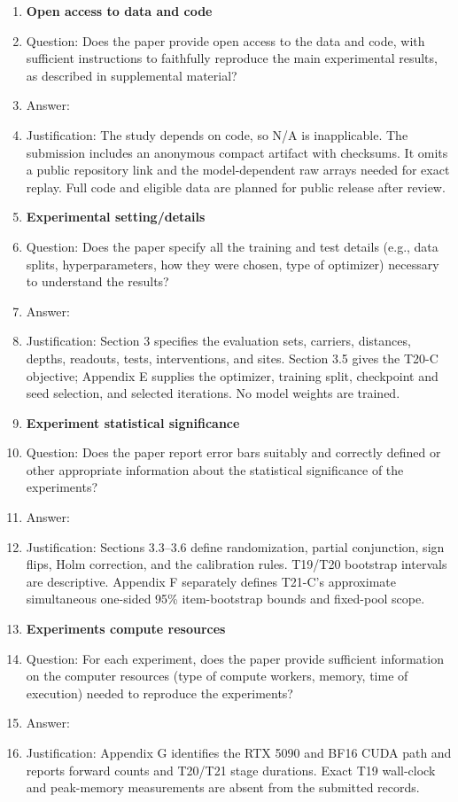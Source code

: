 \begin{enumerate}
\item {\bf Open access to data and code}
  \item[] Question: Does the paper provide open access to the data and code, with sufficient instructions to faithfully reproduce the main experimental results, as described in supplemental material?
  \item[] Answer: \answerNo{}
  \item[] Justification: The study depends on code, so N/A is inapplicable. The submission includes an anonymous compact artifact with checksums. It omits a public repository link and the model-dependent raw arrays needed for exact replay. Full code and eligible data are planned for public release after review.

\item {\bf Experimental setting/details}
  \item[] Question: Does the paper specify all the training and test details (e.g., data splits, hyperparameters, how they were chosen, type of optimizer) necessary to understand the results?
  \item[] Answer: \answerYes{}
  \item[] Justification: Section 3 specifies the evaluation sets, carriers, distances, depths, readouts, tests, interventions, and sites. Section 3.5 gives the T20-C objective; Appendix E supplies the optimizer, training split, checkpoint and seed selection, and selected iterations. No model weights are trained.

\item {\bf Experiment statistical significance}
  \item[] Question: Does the paper report error bars suitably and correctly defined or other appropriate information about the statistical significance of the experiments?
  \item[] Answer: \answerYes{}
  \item[] Justification: Sections 3.3--3.6 define randomization, partial conjunction, sign flips, Holm correction, and the calibration rules. T19/T20 bootstrap intervals are descriptive. Appendix F separately defines T21-C's approximate simultaneous one-sided 95\% item-bootstrap bounds and fixed-pool scope.

\item {\bf Experiments compute resources}
  \item[] Question: For each experiment, does the paper provide sufficient information on the computer resources (type of compute workers, memory, time of execution) needed to reproduce the experiments?
  \item[] Answer: \answerNo{}
  \item[] Justification: Appendix G identifies the RTX 5090 and BF16 CUDA path and reports forward counts and T20/T21 stage durations. Exact T19 wall-clock and peak-memory measurements are absent from the submitted records.


\end{enumerate}
